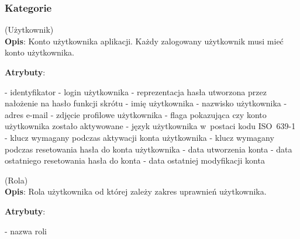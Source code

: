 \subsubsection{Kategorie}\label{subsubsec:database:gateway:categories}

\begin{enumerate}[label={\textbf{KAT/1/\protect\twodigits{\theenumi}}}, wide, labelwidth=!, labelindent=0pt, labelsep=0pt, series=reqs]
    \setlength\itemsep{1.75em}
    \label{kat:User} (Użytkownik)\\
    \indent\textbf{Opis}: Konto użytkownika aplikacji. Każdy zalogowany użytkownik musi mieć konto użytkownika.
    \par
    \textbf{Atrybuty}:
    \begin{itemize}[series=atr, wide, align=left, leftmargin=190pt]
        \label{kat:User:id}- identyfikator
        \label{kat:User:login}- login użytkownika
        \label{kat:User:passwordHash}- reprezentacja hasła utworzona przez nałożenie na hasło funkcji skrótu
        \label{kat:User:firstName}- imię użytkownika
        \label{kat:User:lastName}- nazwisko użytkownika
        \label{kat:User:email}- adres e-mail
        \label{kat:User:image}- zdjęcie profilowe użytkownika
        \label{kat:User:activated}- flaga pokazująca czy konto użytkownika zostało aktywowane
        \label{kat:User:language}- język użytkownika w~postaci kodu ISO~639-1
        \label{kat:User:activationKey}- klucz wymagany podczas aktywacji konta użytkownika
        \label{kat:User:resetKey}- klucz wymagany podczas resetowania hasła do konta użytkownika
        \label{kat:User:createdDate}- data utworzenia konta
        \label{kat:User:resetDate}- data ostatniego resetowania hasła do konta
        \label{kat:User:lastModifiedDate}- data ostatniej modyfikacji konta
    \end{itemize}

    \label{kat:Authority} (Rola)\\
    \indent\textbf{Opis}: Rola użytkownika od której zależy zakres uprawnień użytkownika.
    \par
    \textbf{Atrybuty}:
    \begin{itemize}[series=atr, wide, align=left, leftmargin=190pt]
        \label{kat:Authority:name}- nazwa roli
    \end{itemize}


\end{enumerate}
